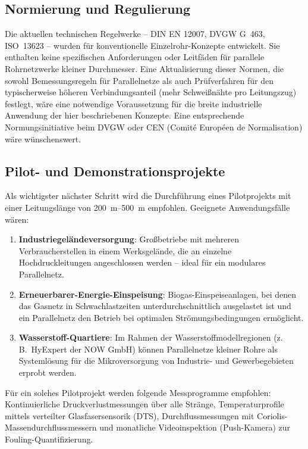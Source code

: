 ﻿\documentclass[12pt,a4paper,twoside]{article}
\theoremstyle{plain}
\theoremstyle{definition}
\theoremstyle{remark}
\begin{document}
\subsection{Normierung und Regulierung}
\label{ssec:ausblick_normen}

Die aktuellen technischen Regelwerke -- DIN EN 12007, DVGW G~463,
ISO~13623 -- wurden für konventionelle Einzelrohr-Konzepte entwickelt.
Sie enthalten keine spezifischen Anforderungen oder Leitfäden für
parallele Rohrnetzwerke kleiner Durchmesser.
Eine Aktualisierung dieser Normen, die sowohl Bemessungsregeln für Parallelnetze
als auch Prüfverfahren für den typischerweise höheren Verbindungsanteil
(mehr Schweißnähte pro Leitungszug) festlegt, wäre eine notwendige Voraussetzung
für die breite industrielle Anwendung der hier beschriebenen Konzepte.
Eine entsprechende Normungsinitiative beim DVGW oder CEN (Comité Européen
de Normalisation) wäre wünschenswert.

\subsection{Pilot- und Demonstrationsprojekte}
\label{ssec:ausblick_pilot}

Als wichtigster nächster Schritt wird die Durchführung eines
Pilot\-pro\-jekts mit einer Leitungslänge von \SIrange{200}{500}{\metre}
empfohlen.
Geeignete Anwendungsfälle wären:
\begin{enumerate}
  \item \textbf{Industriegeländeversorgung}: Großbetriebe mit mehreren
        Verbraucherstellen in einem Werksgelände, die an einzelne
        Hochdruckleitungen angeschlossen werden -- ideal für ein modulares
        Parallelnetz.
  \item \textbf{Erneuerbarer-Energie-Einspeisung}: Biogas-Einspeiseanlagen,
        bei denen das Gasnetz in Schwachlastzeiten unterdurchschnittlich
        ausgelastet ist und ein Parallelnetz den Betrieb bei optimalen
        Strömungsbedingungen ermöglicht.
  \item \textbf{Wasserstoff-Quartiere}: Im Rahmen der Wasserstoffmodellregionen
        (z.\,B.\ HyExpert der NOW GmbH) können Parallelnetze kleiner Rohre
        als Systemlösung für die Mikroversorgung von Industrie- und
        Gewerbegebieten erprobt werden.
\end{enumerate}

Für ein solches Pilotprojekt werden folgende Messprogramme empfohlen:
Kontinuierliche Druckverlustmessungen über alle Stränge, Temperaturprofile
mittels verteilter Glasfasersensorik (DTS), Durchflussmessungen mit
Coriolis-Massendurchflussmessern und monatliche Videoinspektion (Push-Kamera)
zur Fouling-Quantifizierung.
\end{document}
